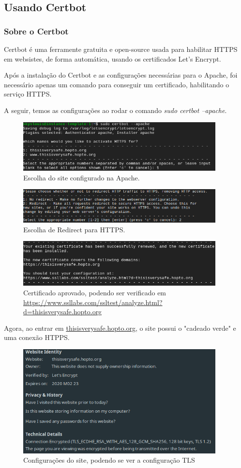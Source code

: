 \documentclass{article}
\begin{document}
\subsection{Usando Certbot}
\subsubsection{Sobre o Certbot}
Certbot é uma ferramente gratuita e open-source usada para habilitar HTTPS em websistes, de forma automática, usando os certificados Let's Encrypt. 

Após a instalação do Certbot e as configurações necessárias para o Apache, foi necessário apenas um comando para conseguir um certificado, habilitando o serviço HTTPS.

A seguir, temos as configurações ao rodar o comando \emph{sudo certbot --apache}.
\begin{figure}[h]
\centering
\includegraphics[width=10.5cm]{imagem4.png}
\caption{Escolha do site configurado na Apache.}
\end{figure}
\begin{figure}[h]
\centering
\includegraphics[width=10.5cm]{imagem5.png}
\caption{Escolha de Redirect para HTTPS.}
\end{figure}
\begin{figure}[h]
\centering
\includegraphics[width=10.5cm]{imagem6.png}
\caption{Certificado aprovado, podendo ser verificado em \url{https://www.ssllabs.com/ssltest/analyze.html?d=thisisverysafe.hopto.org}}
\end{figure}

Agora, ao entrar em \url{thisisverysafe.hopto.org}, o site possui o "cadeado verde" e uma conexão HTPPS.

\begin{figure}[H]
\centering
\includegraphics[width=10.5cm]{imagem7.png}
\caption{Configurações do site, podendo se ver a configuração TLS}
\end{figure}
\end{document}
